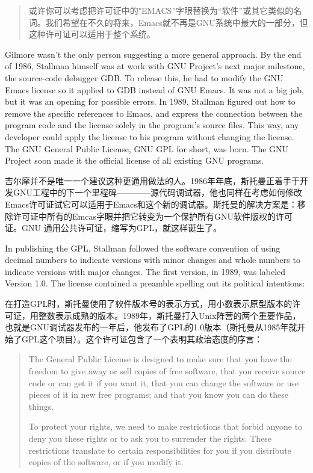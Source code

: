 \ifdefined\chs
\begin{quote}
或许你可以考虑把许可证中的"EMACS”字眼替换为“软件”或其它类似的名词。我们希望在不久的将来，Emacs就不再是GNU系统中最大的一部分，但这种许可证可以适用于整个系统。 
\end{quote}
\fi

\ifdefined\eng
Gilmore wasn't the only person suggesting a more general approach. By the end of 1986, Stallman himself was at work with GNU Project's next major milestone, the source-code debugger GDB.  To release this, he had to modify the GNU Emacs license so it applied to GDB instead of GNU Emacs.  It was not a big job, but it was an opening for possible errors.  In 1989, Stallman figured out how to remove the specific references to Emacs, and express the connection between the program code and the license solely in the program's source files.  This way, any developer could apply the license to his program without changing the license. The GNU General Public License, GNU GPL for short, was born.  The GNU Project soon made it the official license of all existing GNU programs.
\fi

\ifdefined\chs
吉尔摩并不是唯一一个建议这种更通用做法的人。1986年年底，斯托曼正着手于开发GNU工程中的下一个里程碑————源代码调试器，他也同样在考虑如何修改Emacs许可证试它可以适用于Emacs和这个新的调试器。斯托曼的解决方案是：移除许可证中所有的Emcas字眼并把它转变为一个保护所有GNU软件版权的许可证。GNU 通用公共许可证，缩写为GPL，就这样诞生了。
\fi

\ifdefined\eng
In publishing the GPL, Stallman followed the software convention of using decimal numbers to indicate versions with minor changes and whole numbers to indicate versions with major changes. The first version, in 1989, was labeled Version 1.0. The license contained a preamble spelling out its political intentions:
\fi

\ifdefined\chs
在打造GPL时，斯托曼使用了软件版本号的表示方式，用小数表示原型版本的许可证，用整数表示成熟的版本。1989年，斯托曼打入Unix阵营的两个重要作品，也就是GNU调试器发布的一年后，他发布了GPL的1.0版本（斯托曼从1985年就开始了GPL这个项目）。这个许可证包含了一个表明其政治态度的序言：
\fi

\ifdefined\eng
\begin{quote}
The General Public License is designed to make sure that you have the freedom to give away or sell copies of free software, that you receive source code or can get it if you want it, that you can change the software or use pieces of it in new free programs; and that you know you can do these things.

To protect your rights, we need to make restrictions that forbid anyone to deny you these rights or to ask you to surrender the rights. These restrictions translate to certain responsibilities for you if you distribute copies of the software, or if you modify it.
\end{quote}
\fi

